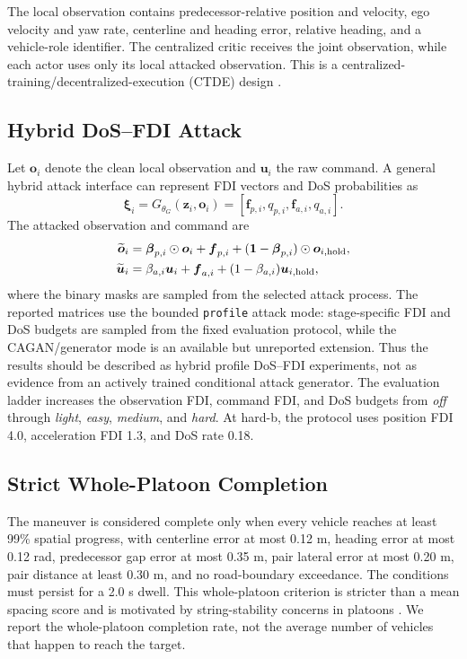 \documentclass[lettersize,journal]{IEEEtran}
\newcommand{\vect}[1]{\boldsymbol{#1}}
\begin{document}
The local observation contains predecessor-relative position and velocity, ego velocity and yaw rate, centerline and heading error, relative heading, and a vehicle-role identifier. The centralized critic receives the joint observation, while each actor uses only its local attacked observation. This is a centralized-training/decentralized-execution (CTDE) design \cite{lowe2017multi,yu2022surprising,he2022happo}.

\subsection{Hybrid DoS--FDI Attack}
Let $\vect{o}_i$ denote the clean local observation and $\vect{u}_i$ the raw command. A general hybrid attack interface can represent FDI vectors and DoS probabilities as
\begin{equation}
\vect{\xi}_i=G_{\theta_G}(\vect{z}_i,\vect{o}_i)
=[\vect{f}_{p,i},q_{p,i},\vect{f}_{a,i},q_{a,i}].
\end{equation}
The attacked observation and command are
\begin{align}
\widetilde{\vect{o}}_i
&=\boldsymbol{\beta}_{p,i}\odot\vect{o}_i+\vect{f}_{p,i}
  +(\mathbf{1}-\boldsymbol{\beta}_{p,i})\odot\vect{o}_{i,\rm hold},\\
\widetilde{\vect{u}}_i
&=\beta_{a,i}\vect{u}_i+\vect{f}_{a,i}
  +(1-\beta_{a,i})\vect{u}_{i,\rm hold},
\label{eq:attack}
\end{align}
where the binary masks are sampled from the selected attack process. The reported matrices use the bounded \texttt{profile} attack mode: stage-specific FDI and DoS budgets are sampled from the fixed evaluation protocol, while the CAGAN/generator mode is an available but unreported extension. Thus the results should be described as hybrid profile DoS--FDI experiments, not as evidence from an actively trained conditional attack generator. The evaluation ladder increases the observation FDI, command FDI, and DoS budgets from \textit{off} through \textit{light}, \textit{easy}, \textit{medium}, and \textit{hard}. At hard-b, the protocol uses position FDI 4.0, acceleration FDI 1.3, and DoS rate 0.18.

\subsection{Strict Whole-Platoon Completion}
The maneuver is considered complete only when every vehicle reaches at least 99\% spatial progress, with centerline error at most 0.12 m, heading error at most 0.12 rad, predecessor gap error at most 0.35 m, pair lateral error at most 0.20 m, pair distance at least 0.30 m, and no road-boundary exceedance. The conditions must persist for a 2.0 s dwell. This whole-platoon criterion is stricter than a mean spacing score and is motivated by string-stability concerns in platoons \cite{swaroop1996string}. We report the whole-platoon completion rate, not the average number of vehicles that happen to reach the target.
\end{document}
